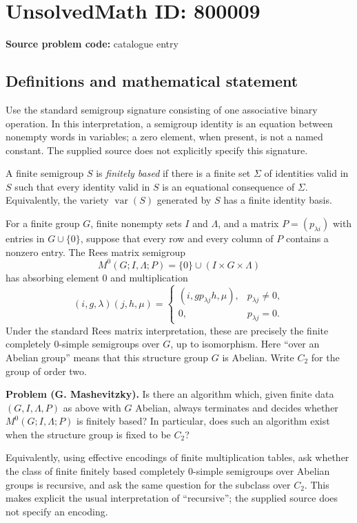 \documentclass[11pt]{article}
\begin{document}
\section*{UnsolvedMath ID: 800009}
\textbf{Source problem code:} catalogue entry
\subsection{Definitions and mathematical statement}
Use the standard semigroup signature consisting of one associative binary operation. In this interpretation, a semigroup identity is an equation between nonempty words in variables; a zero element, when present, is not a named constant. The supplied source does not explicitly specify this signature.

A finite semigroup \(S\) is \emph{finitely based} if there is a finite set \(\Sigma\) of identities valid in \(S\) such that every identity valid in \(S\) is an equational consequence of \(\Sigma\). Equivalently, the variety \(\operatorname{var}(S)\) generated by \(S\) has a finite identity basis.

For a finite group \(G\), finite nonempty sets \(I\) and \(\Lambda\), and a matrix \(P=(p_{\lambda i})\) with entries in \(G\cup\{0\}\), suppose that every row and every column of \(P\) contains a nonzero entry. The Rees matrix semigroup
\[
M^0(G;I,\Lambda;P)=\{0\}\cup(I\times G\times\Lambda)
\]
has absorbing element \(0\) and multiplication
\[
(i,g,\lambda)(j,h,\mu)=
\begin{cases}
(i,gp_{\lambda j}h,\mu),&p_{\lambda j}\ne0,\\
0,&p_{\lambda j}=0.
\end{cases}
\]
Under the standard Rees matrix interpretation, these are precisely the finite completely \(0\)-simple semigroups over \(G\), up to isomorphism. Here ``over an Abelian group'' means that this structure group \(G\) is Abelian. Write \(C_2\) for the group of order two.

\textbf{Problem (G. Mashevitzky).} Is there an algorithm which, given finite data \((G,I,\Lambda,P)\) as above with \(G\) Abelian, always terminates and decides whether \(M^0(G;I,\Lambda;P)\) is finitely based? In particular, does such an algorithm exist when the structure group is fixed to be \(C_2\)?

Equivalently, using effective encodings of finite multiplication tables, ask whether the class of finite finitely based completely \(0\)-simple semigroups over Abelian groups is recursive, and ask the same question for the subclass over \(C_2\). This makes explicit the usual interpretation of ``recursive''; the supplied source does not specify an encoding.
\end{document}
